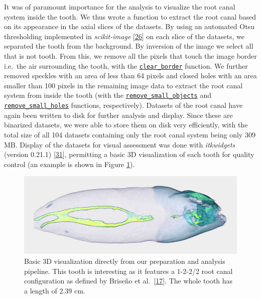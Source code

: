 \documentclass[
  american,
]{article}
\begin{document}
It was of paramount importance for the analysis to visualize the root canal system inside the tooth.
We thus wrote a function to extract the root canal based on its appearance in the axial slices of the datasets.
By using an automated Otsu thresholding implemented in \emph{scikit-image} {[}\protect\hyperlink{ref-stvWEJeu}{26}{]} on each slice of the datasets, we separated the tooth from the background.
By inversion of the image we select all that is not tooth.
From this, we remove all the pixels that touch the image border i.e.~the air surrounding the tooth, with the \href{https://scikit-image.org/docs/dev/api/skimage.segmentation.html\#skimage.segmentation.clear_border}{\texttt{clear\_border}} function.
We further removed speckles with an area of less than 64 pixels and closed holes with an area smaller than 100 pixels in the remaining image data to extract the root canal system from inside the tooth (with the \href{https://scikit-image.org/docs/dev/api/skimage.morphology.html\#skimage.morphology.remove_small_objects}{\texttt{remove\_small\_objects}} and
\href{https://scikit-image.org/docs/dev/api/skimage.morphology.html\#skimage.morphology.remove_small_holes}{\texttt{remove\_small\_holes}} functions, respectively).
Datasets of the root canal have again been written to disk for further analysis and display.
Since these are binarized datasets, we were able to store them on disk very efficiently, with the total size of all 104 datasets containing only the root canal system being only 309 MB.
Display of the datasets for visual assessment was done with \emph{itkwidgets} (version 0.21.1) {[}\protect\hyperlink{ref-v85zR2Z2}{31}{]}, permitting a basic 3D visualization of each tooth for quality control (an example is shown in Figure \ref{fig:3ditkwidgets}).

\begin{figure}
\hypertarget{fig:3ditkwidgets}{%
\centering
\includegraphics{images/Tooth045.itkwidgets.png}
\caption{Basic 3D visualization directly from our preparation and analysis pipeline.
This tooth is interesting as it features a 1-2-2/2 root canal configuration as defined by Briseño et al.~{[}\protect\hyperlink{ref-ZTgDEakx}{17}{]}.
The whole tooth has a length of 2.39 cm.}\label{fig:3ditkwidgets}
}
\end{figure}
\end{document}
